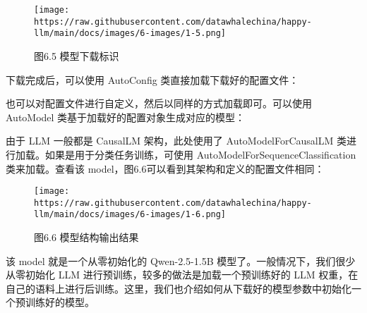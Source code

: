 \documentclass[12pt,a4paper]{book}
\begin{document}
\begin{figure}[htbp]\centering
\texttt{[image: https://raw.githubusercontent.com/datawhalechina/happy-llm/main/docs/images/6-images/1-5.png]}
\caption{图6.5 模型下载标识}
\end{figure}

下载完成后，可以使用 AutoConfig 类直接加载下载好的配置文件：

\begin{Shaded}
\begin{Highlighting}[]

\OperatorTok{=} 
\OperatorTok{=}
\end{Highlighting}
\end{Shaded}

也可以对配置文件进行自定义，然后以同样的方式加载即可。可以使用 AutoModel
类基于加载好的配置对象生成对应的模型：

\begin{Shaded}
\begin{Highlighting}[]

\OperatorTok{=}\OperatorTok{=}\NormalTok{)}
\end{Highlighting}
\end{Shaded}

由于 LLM 一般都是 CausalLM 架构，此处使用了 AutoModelForCausalLM
类进行加载。如果是用于分类任务训练，可使用
AutoModelForSequenceClassification 类来加载。查看该
model，图6.6可以看到其架构和定义的配置文件相同：

\begin{figure}[htbp]\centering
\texttt{[image: https://raw.githubusercontent.com/datawhalechina/happy-llm/main/docs/images/6-images/1-6.png]}
\caption{图6.6 模型结构输出结果}
\end{figure}

该 model 就是一个从零初始化的 Qwen-2.5-1.5B
模型了。一般情况下，我们很少从零初始化 LLM
进行预训练，较多的做法是加载一个预训练好的 LLM
权重，在自己的语料上进行后训练。这里，我们也介绍如何从下载好的模型参数中初始化一个预训练好的模型。
\end{document}
